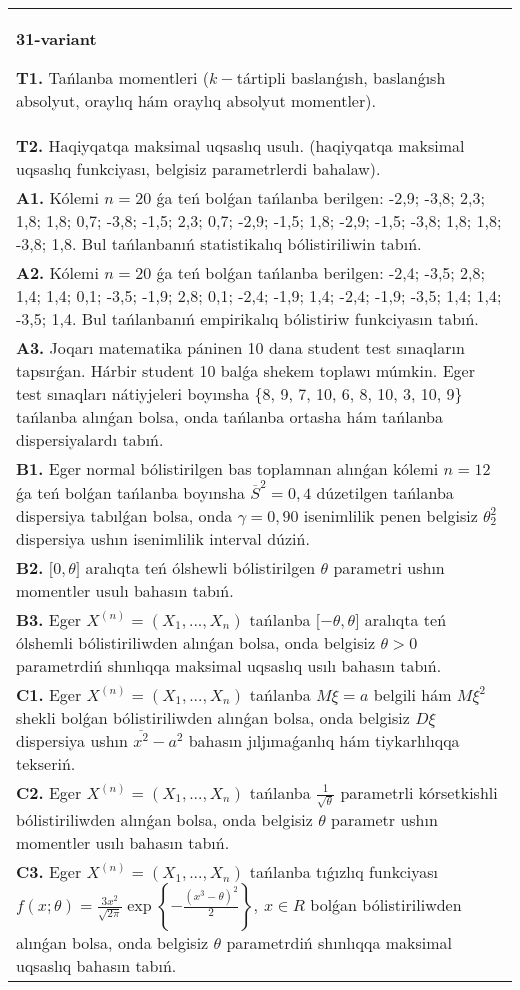 \documentclass{article}
\begin{document}
\begin{tabular}{m{17cm}}
\textbf{31-variant}
\newline

\textbf{T1.} 
Tańlanba momentleri (\(k -\)tártipli baslanǵısh, baslanǵısh absolyut, oraylıq hám oraylıq absolyut momentler).
 \\
\textbf{T2.} 
Haqiyqatqa maksimal uqsaslıq usulı. (haqiyqatqa maksimal uqsaslıq funkciyası, belgisiz parametrlerdi bahalaw).
 \\
\textbf{A1.} 
Kólemi \(n = 20\) ǵa teń bolǵan tańlanba berilgen: -2,9; -3,8; 2,3; 1,8; 1,8; 0,7; -3,8; -1,5; 2,3; 0,7; -2,9; -1,5; 1,8; -2,9; -1,5; -3,8; 1,8; 1,8; -3,8; 1,8. Bul tańlanbanıń statistikalıq bólistiriliwin tabıń.
 \\
\textbf{A2.} 
Kólemi \(n = 20\) ǵa teń bolǵan tańlanba berilgen: -2,4; -3,5; 2,8; 1,4; 1,4; 0,1; -3,5; -1,9; 2,8; 0,1; -2,4; -1,9; 1,4; -2,4; -1,9; -3,5; 1,4; 1,4; -3,5; 1,4. Bul tańlanbanıń empirikalıq bólistiriw funkciyasın tabıń.
 \\
\textbf{A3.} 
Joqarı matematika páninen 10 dana student test sınaqların tapsırǵan. Hárbir student 10 balǵa shekem toplawı múmkin. Eger test sınaqları nátiyjeleri boyınsha \{8, 9, 7, 10, 6, 8, 10, 3, 10, 9\} tańlanba alınǵan bolsa, onda tańlanba ortasha hám tańlanba dispersiyalardı tabıń.
 \\
\textbf{B1.} 
Eger normal bólistirilgen bas toplamnan alınǵan kólemi \(n = 12\) ǵa teń bolǵan tańlanba boyınsha \({\overline{S}}^{2} = 0,4\) dúzetilgen tańlanba dispersiya tabılǵan bolsa, onda \(\gamma = 0,90\) isenimlilik penen belgisiz \(\theta_{2}^{2}\) dispersiya ushın isenimlilik interval dúziń.
 \\
\textbf{B2.} 
\(\lbrack 0,\theta\rbrack\) aralıqta teń ólshewli bólistirilgen \(\theta\) parametri ushın momentler usulı bahasın tabıń.
 \\
\textbf{B3.} 
Eger \(X^{(n)} = \left( X_{1},...,X_{n} \right)\) tańlanba \(\lbrack - \theta,\theta\rbrack\) aralıqta teń ólshemli bólistiriliwden alınǵan bolsa, onda belgisiz \(\theta > 0\) parametrdiń shınlıqqa maksimal uqsaslıq usılı bahasın tabıń.
 \\
\textbf{C1.} 
Eger \(X^{(n)} = \left( X_{1},...,X_{n} \right)\) tańlanba \(M\xi = a\) belgili hám \(M\xi^{2}\) shekli bolǵan bólistiriliwden alınǵan bolsa, onda belgisiz \(D\xi\) dispersiya ushın \(\overline{x^{2}} - a^{2}\) bahasın jıljımaǵanlıq hám tiykarlılıqqa tekseriń.
 \\
\textbf{C2.} 
Eger \(X^{(n)} = \left( X_{1},...,X_{n} \right)\) tańlanba \(\frac{1}{\sqrt{\theta}}\) parametrli kórsetkishli bólistiriliwden alınǵan bolsa, onda belgisiz \(\theta\) parametr ushın momentler usılı bahasın tabıń.
 \\
\textbf{C3.} 
Eger \(X^{(n)} = \left( X_{1},...,X_{n} \right)\) tańlanba tıǵızlıq funkciyası
$f(x;\theta) = \frac{3x^{2}}{\sqrt{2\pi}}\exp\left\{ - \frac{\left( x^{3} - \theta \right)^{2}}{2} \right\},\ x \in R$
bolǵan bólistiriliwden alınǵan bolsa, onda belgisiz \(\theta\) parametrdiń shınlıqqa maksimal uqsaslıq bahasın tabıń.
 \\

\end{tabular}
\vspace{1cm}
\end{document}
